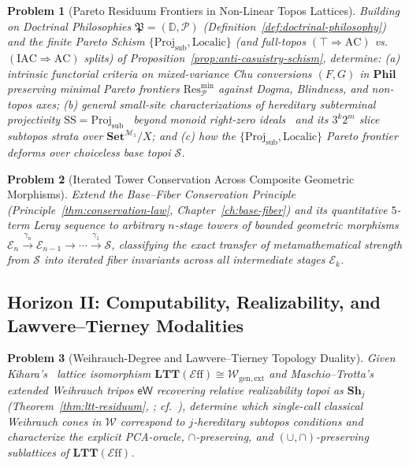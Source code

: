 \documentclass[10pt,twoside,openright]{book}
\theoremstyle{crmplain}
\newtheorem{problem}{Problem}[chapter]
\theoremstyle{crmdef}
\theoremstyle{crmremark}
\newcommand{\Eff}{\mathcal{E}\mathrm{ff}}
\begin{document}
\begin{problem}[Pareto Residuum Frontiers in Non-Linear Topos Lattices]\label{prob:open-1}%
%
Building on Doctrinal Philosophies $\mathfrak{P} = (\mathbb{D}, \mathcal{P})$ (Definition~\ref{def:doctrinal-philosophy}) and the finite Pareto Schism $\{\mathrm{Proj}_{\mathrm{sub}}, \mathrm{Localic}\}$ (and full-topos $(\top \Rightarrow \mathrm{AC})$ vs.\ $(\mathrm{IAC} \Rightarrow \mathrm{AC})$ splits) of Proposition~\ref{prop:anti-casuistry-schism}, determine: \textup{(a)} intrinsic functorial criteria on mixed-variance Chu conversions $(F, G)$ in $\mathbf{Phil}$~\cite{Shulman20,HHLN23} preserving minimal Pareto frontiers $\mathrm{Res}_{\mathcal{P}}^{\min}$ against Dogma, Blindness, and non-topos axes; \textup{(b)} general small-site characterizations of hereditary subterminal projectivity $\mathrm{SS} = \mathrm{Proj}_{\mathrm{sub}}$~\cite{FreydScedrov90} beyond monoid right-zero ideals~\cite{HemelaerRogers21} and its $3^k 2^m$ slice subtopos strata over $\mathbf{Set}^{\mathcal{M}_1}/X$; and \textup{(c)} how the $\{\mathrm{Proj}_{\mathrm{sub}}, \mathrm{Localic}\}$ Pareto frontier deforms over choiceless base topoi $\mathcal{S}$.
\end{problem}

\begin{problem}[Iterated Tower Conservation Across Composite Geometric Morphisms]\label{prob:open-2}
Extend the Base--Fiber Conservation Principle (Principle~\ref{thm:conservation-law}, Chapter~\ref{ch:base-fiber}) and its quantitative $5$-term Leray sequence to arbitrary $n$-stage towers of bounded geometric morphisms $\mathcal{E}_n \xrightarrow{\gamma_n} \mathcal{E}_{n-1} \to \cdots \xrightarrow{\gamma_1} \mathcal{S}$, classifying the exact transfer of metamathematical strength from $\mathcal{S}$ into iterated fiber invariants across all intermediate stages $\mathcal{E}_k$.
\end{problem}

\subsection*{Horizon II: Computability, Realizability, and Lawvere--Tierney Modalities}

\begin{problem}[Weihrauch-Degree and Lawvere--Tierney Topology Duality]\label{prob:open-3}
Given Kihara's~\cite{Kihara23} lattice isomorphism $\mathbf{LTT}(\Eff) \cong \mathcal{W}_{\mathrm{gen,ext}}$ and Maschio--Trotta's~\cite{MaschioTrotta26} extended Weihrauch tripos $\mathsf{eW}$ recovering relative realizability topoi as $\mathbf{Sh}_j$ (Theorem~\ref{thm:ltt-residuum}, \cite{Hyland82,LeeVanOosten13,vanOosten08}; cf.~\cite{LietzStreicher12}), determine which single-call classical Weihrauch cones in $\mathcal{W}$ correspond to $j$-hereditary subtopos conditions and characterize the explicit PCA-oracle, $\cap$-preserving, and $(\cup, \cap)$-preserving sublattices of $\mathbf{LTT}(\Eff)$.
\end{problem}
\end{document}
